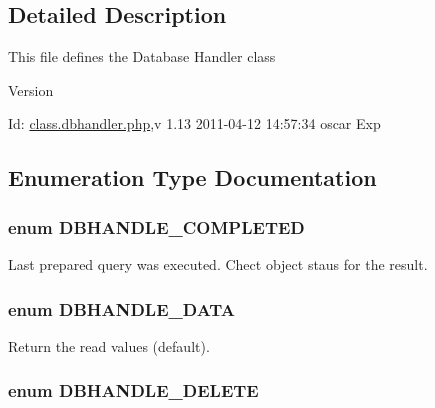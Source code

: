 \subsection{Detailed Description}
This file defines the Database Handler class \begin{DoxyVersion}{Version}

\end{DoxyVersion}
\begin{DoxyParagraph}{Id:}
\hyperlink{class_8dbhandler_8php}{class.dbhandler.php},v 1.13 2011-\/04-\/12 14:57:34 oscar Exp 
\end{DoxyParagraph}


\subsection{Enumeration Type Documentation}
\subsubsection[{DBHANDLE\_\-COMPLETED}]{\setlength{\rightskip}{0pt plus 5cm}enum {\bf DBHANDLE\_\-COMPLETED}}\label{class_8dbhandler_8php_a81abd823ff43027e2a788e4d5993790f}


Last prepared query was executed. Chect object staus for the result. 

\subsubsection[{DBHANDLE\_\-DATA}]{\setlength{\rightskip}{0pt plus 5cm}enum {\bf DBHANDLE\_\-DATA}}\label{class_8dbhandler_8php_acc5178c2a582eafa4ef488ed3394b725}


Return the read values (default). 

\subsubsection[{DBHANDLE\_\-DELETE}]{\setlength{\rightskip}{0pt plus 5cm}enum {\bf DBHANDLE\_\-DELETE}}\label{class_8dbhandler_8php_a978ad3c1b4647dae1fe77c7f8c757da5}


